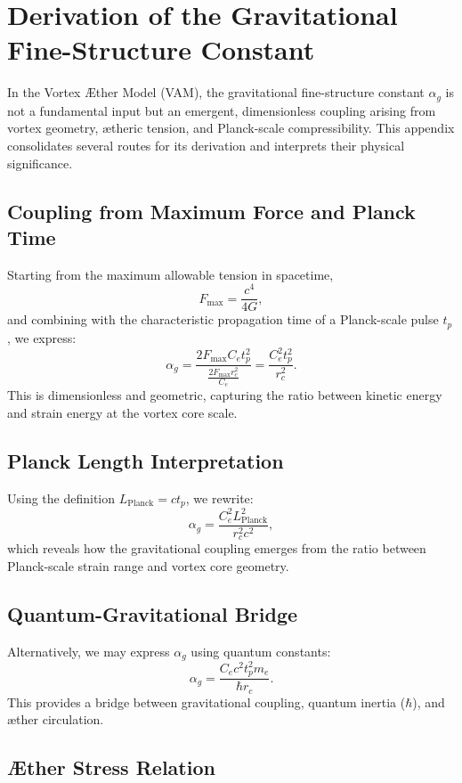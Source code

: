 \section{Derivation of the Gravitational Fine-Structure Constant}
\label{appendix:alpha_g}

In the Vortex Æther Model (VAM), the gravitational fine-structure constant $\alpha_g$ is not a fundamental input but an emergent, dimensionless coupling arising from vortex geometry, ætheric tension, and Planck-scale compressibility. This appendix consolidates several routes for its derivation and interprets their physical significance.

\subsection*{Coupling from Maximum Force and Planck Time}

Starting from the maximum allowable tension in spacetime,
\[
    F_{\text{max}} = \frac{c^4}{4G},
\]
and combining with the characteristic propagation time of a Planck-scale pulse $t_p$, we express:
\[
    \alpha_g = \frac{2 F_{\text{max}} C_e t_p^2}{\frac{2 F_{\text{max}} r_c^2}{C_e}} = \frac{C_e^2 t_p^2}{r_c^2}.
\]
This is dimensionless and geometric, capturing the ratio between kinetic energy and strain energy at the vortex core scale.

\subsection*{Planck Length Interpretation}

Using the definition $L_{\text{Planck}} = c t_p$, we rewrite:
\[
    \alpha_g = \frac{C_e^2 L_{\text{Planck}}^2}{r_c^2 c^2},
\]
which reveals how the gravitational coupling emerges from the ratio between Planck-scale strain range and vortex core geometry.

\subsection*{Quantum-Gravitational Bridge}

Alternatively, we may express $\alpha_g$ using quantum constants:
\[
    \alpha_g = \frac{C_e c^2 t_p^2 m_e}{\hbar r_c}.
\]
This provides a bridge between gravitational coupling, quantum inertia ($\hbar$), and æther circulation.

\subsection*{Æther Stress Relation}

